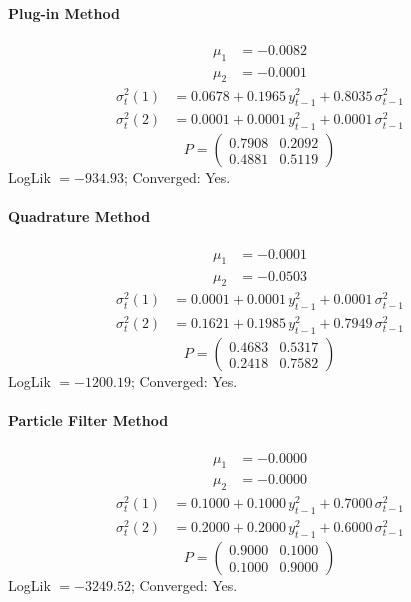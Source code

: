 \documentclass[11pt, a4paper]{article}
\begin{document}
\paragraph{Plug-in Method}
\begin{align}
\mu_{1} &= -0.0082 \\
\mu_{2} &= -0.0001
\end{align}
\begin{align}
\sigma^2_{t}(1) &= 0.0678 + 0.1965\, y_{t-1}^2 + 0.8035\, \sigma^2_{t-1} \\
\sigma^2_{t}(2) &= 0.0001 + 0.0001\, y_{t-1}^2 + 0.0001\, \sigma^2_{t-1}
\end{align}
\begin{equation}
P = \begin{pmatrix} 0.7908 & 0.2092 \\ 0.4881 & 0.5119 \end{pmatrix}
\end{equation}
LogLik $= -934.93$; Converged: Yes.

\paragraph{Quadrature Method}
\begin{align}
\mu_{1} &= -0.0001 \\
\mu_{2} &= -0.0503
\end{align}
\begin{align}
\sigma^2_{t}(1) &= 0.0001 + 0.0001\, y_{t-1}^2 + 0.0001\, \sigma^2_{t-1} \\
\sigma^2_{t}(2) &= 0.1621 + 0.1985\, y_{t-1}^2 + 0.7949\, \sigma^2_{t-1}
\end{align}
\begin{equation}
P = \begin{pmatrix} 0.4683 & 0.5317 \\ 0.2418 & 0.7582 \end{pmatrix}
\end{equation}
LogLik $= -1200.19$; Converged: Yes.

\paragraph{Particle Filter Method}
\begin{align}
\mu_{1} &= -0.0000 \\
\mu_{2} &= -0.0000
\end{align}
\begin{align}
\sigma^2_{t}(1) &= 0.1000 + 0.1000\, y_{t-1}^2 + 0.7000\, \sigma^2_{t-1} \\
\sigma^2_{t}(2) &= 0.2000 + 0.2000\, y_{t-1}^2 + 0.6000\, \sigma^2_{t-1}
\end{align}
\begin{equation}
P = \begin{pmatrix} 0.9000 & 0.1000 \\ 0.1000 & 0.9000 \end{pmatrix}
\end{equation}
LogLik $= -3249.52$; Converged: Yes.
\end{document}

